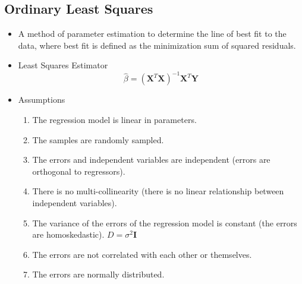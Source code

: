 \documentclass[11pt]{article}
\begin{document}
\subsection{Ordinary Least Squares}
\begin{itemize}
    \item A method of parameter estimation to determine the line of best fit to the data, where 
    best fit is defined as the minimization sum of squared residuals.
    \item Least Squares Estimator
    \[\hat{\beta} = {(\boldsymbol{X}^T \boldsymbol{X})}^{-1} \boldsymbol{X}^T \boldsymbol{Y}\]
    \item Assumptions
    \begin{enumerate}
        \item The regression model is linear in parameters. 
        \item The samples are randomly sampled. 
        \item The errors and independent variables are independent (errors are orthogonal to regressors).
        \item There is no multi-collinearity (there is no linear relationship between 
        independent variables).
        \item The variance of the errors of the regression model is constant (the errors are 
        homoskedastic). $D = \sigma^2 \boldsymbol{I}$
        \item The errors are not correlated with each other or themselves. 
        \item The errors are normally distributed.
    \end{enumerate}
\end{itemize}
\end{document}
